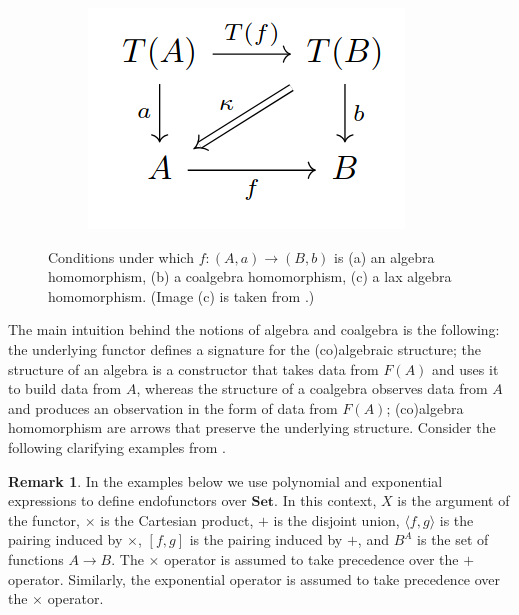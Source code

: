 \documentclass[11pt,a4paper,openright,twoside]{report}
\newcounter{mycounter}
\theoremstyle{plain}
\theoremstyle{definition}
\newtheorem{remark}[mycounter]{Remark}
\begin{document}
\begin{figure}[h]
\begin{center}
\begin{subfigure}{0.25\textwidth}
      \caption{}
    \end{subfigure}   
    \begin{subfigure}{0.25\textwidth}
      \includegraphics[width=\textwidth]{figures/lax_algebra_hom.png}
      \caption{}
    \end{subfigure}            
    \caption[(Co)algebra homomorphisms]{Conditions under which $f:(A,a)\to(B,b)$ is (a) an algebra homomorphism, (b) a coalgebra homomorphism, (c) a lax algebra homomorphism. (Image (c) is taken from \cite{gavranovicposition}.)}
    \label{fig: alghom}
  \end{center}
\end{figure}


The main intuition behind the notions of algebra and coalgebra is the following: the underlying functor defines a signature for the (co)algebraic structure; the structure of an algebra is a constructor that takes data from $F(A)$ and uses it to build data from $A$, whereas the structure of a coalgebra observes data from $A$ and produces an observation in the form of data from $F(A)$; (co)algebra homomorphism are arrows that preserve the underlying structure. Consider the following clarifying examples from \cite{gavranovicposition}.

\begin{remark}
  In the examples below we use polynomial and exponential expressions to define endofunctors over $\mathbf{Set}$. In this context, $X$ is the argument of the functor, $\times$ is the Cartesian product, $+$ is the disjoint union, $\langle f,g \rangle$ is the pairing induced by $\times$, $[f,g]$ is the pairing induced by $+$, and $B^A$ is the set of functions $A \to B$. The $\times$ operator is assumed to take precedence over the $+$ operator. Similarly, the exponential operator is assumed to take precedence over the $\times$ operator. 
\end{remark}
\end{document}
